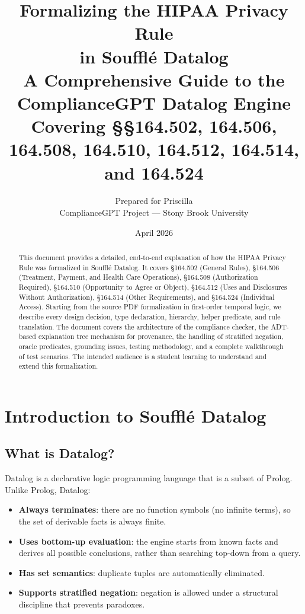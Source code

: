 \documentclass[11pt,letterpaper]{article}
\title{%
  \textbf{Formalizing the HIPAA Privacy Rule}\\
  \textbf{in Souffl\'{e} Datalog}\\[0.5em]
  \large A Comprehensive Guide to the ComplianceGPT Datalog Engine\\
  \large Covering \S\S 164.502, 164.506, 164.508, 164.510, 164.512, 164.514, and 164.524
}
\author{%
  Prepared for Priscilla\\
  ComplianceGPT Project --- Stony Brook University
}
\date{April 2026}
\begin{document}
\maketitle

\begin{abstract}
This document provides a detailed, end-to-end explanation of how the HIPAA Privacy Rule was formalized in Souffl\'{e} Datalog. It covers \S 164.502 (General Rules), \S 164.506 (Treatment, Payment, and Health Care Operations), \S 164.508 (Authorization Required), \S 164.510 (Opportunity to Agree or Object), \S 164.512 (Uses and Disclosures Without Authorization), \S 164.514 (Other Requirements), and \S 164.524 (Individual Access). Starting from the source PDF formalization in first-order temporal logic, we describe every design decision, type declaration, hierarchy, helper predicate, and rule translation. The document covers the architecture of the compliance checker, the ADT-based explanation tree mechanism for provenance, the handling of stratified negation, oracle predicates, grounding issues, testing methodology, and a complete walkthrough of test scenarios. The intended audience is a student learning to understand and extend this formalization.
\end{abstract}

\tableofcontents
\newpage

\section{Introduction to Souffl\'{e} Datalog}
\label{sec:intro-souffle}

\subsection{What is Datalog?}

Datalog is a declarative logic programming language that is a subset of Prolog. Unlike Prolog, Datalog:
\begin{itemize}
  \item \textbf{Always terminates}: there are no function symbols (no infinite terms), so the set of derivable facts is always finite.
  \item \textbf{Uses bottom-up evaluation}: the engine starts from known facts and derives all possible conclusions, rather than searching top-down from a query.
  \item \textbf{Has set semantics}: duplicate tuples are automatically eliminated.
  \item \textbf{Supports stratified negation}: negation is allowed under a structural discipline that prevents paradoxes.
\end{itemize}
\end{document}
